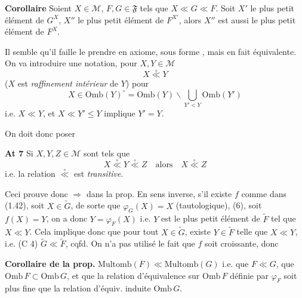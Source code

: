 \documentclass[11pt,a4paper]{article}
\begin{document}
\textbf{Corollaire} Soient $X \in \mathcal{M}$, $F, G \in \mathfrak{F}$ tels que $X \ll G \ll F$. Soit \struck{\ill{}} $X'$ le plus petit élément de $G^{X}$, $X''$ le plus petit élément de $F^{X'}$, alors $X''$ est aussi le plus petit élément de $F^{X}$.

Il semble qu'il faille le prendre en axiome, sous forme \ill{} \ill{}, mais en fait équivalente. On va \struck{\ill{}} introduire une notation, pour $X, Y \in \mathcal{M}$
\[
  X \mathrel{\overset{\circ}{\ll}} Y \tag{1.43}
\]
($X$ est \emph{raffinement intérieur} de $Y$) pour 
\[
  X \in \mathrm{Omb}(Y)^{\circ} = \mathrm{Omb}(Y) \smallsetminus \bigcup_{Y' < Y} \mathrm{Omb}(Y')
\]
i.e. $X \ll Y$, et $X \ll Y' \leq Y$ implique $Y' = Y$.

On doit donc poser

\textbf{At 7} Si $X, Y, Z \in \mathcal{M}$ sont tels que
\[
  X \mathrel{\overset{\circ}{\ll}} Y \mathrel{\overset{\circ}{\ll}} Z \quad \text{alors} \quad X \mathrel{\overset{\circ}{\ll}} Z
\]
i.e. la relation $\overset{\circ}{\ll}$ est \emph{transitive}.

Ceci prouve donc $\Longrightarrow$ dans la prop. En sens inverse, s'il existe $f$ comme dans (1.42), soit $X \in \widetilde{G}$,  de sorte que $\varphi_G(X) = X$ (tautologique),  (6),  soit $f(X) = Y$, on a donc $Y = \varphi_F(X)$ i.e. $Y$ est le plus petit élément de $\widetilde{F}$  tel que $X \ll Y$. Cela   implique donc que pour tout $X \in \widetilde{G}$, existe $Y \in \widetilde{F}$ telle que $X \ll Y$, i.e. (C 4) $\widetilde{G} \ll \widetilde{F}$, cqfd. On n'a pas utilisé le fait que $f$ soit croissante, donc

\textbf{Corollaire  de la prop.}   $\mathrm{Multomb}(F) \ll \mathrm{Multomb}(G)$ i.e. que $F \ll G$,  que $\mathrm{Omb}\, F \subset \mathrm{Omb}\, G$, et que  la relation d'équivalence sur $\mathrm{Omb}\, F$ définie par $\varphi_F$ soit plus fine que la relation d'équiv. induite   $\mathrm{Omb}\, G$.

\end{document}
